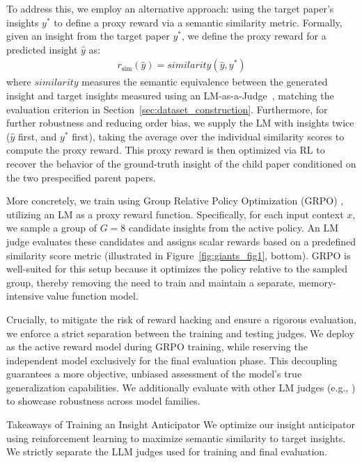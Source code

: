 To address this, we employ an alternative approach: using the target paper's insights $y^{*}$ to define a proxy reward via a semantic similarity metric. Formally, given an insight from the target paper $y^{*}$, we define the proxy reward for a predicted insight $\hat{y}$ as: 
\begin{align}
    r_{\text{sim}}(\hat{y}) = \textit{similarity}(\hat{y}, y^{*})
\end{align}
where $\textit{similarity}$ measures the semantic equivalence between the generated insight and target insights measured using an LM-as-a-Judge~\citep{gu2025surveyllmasajudge}, matching the evaluation criterion in Section~\ref{sec:dataset_construction}. Furthermore, for further robustness and reducing order bias, we supply the LM with insights twice ($\hat{y}$ first, and $y^{*}$ first), taking the average over the individual similarity scores to compute the proxy reward. 
This proxy reward is then optimized via RL to recover the behavior of the ground-truth insight of the child paper conditioned on the two prespecified parent papers.

More concretely, we train \ourmethod{} using Group Relative Policy Optimization (GRPO) \citep{shao2024deepseekmath}, utilizing an LM as a proxy reward function. Specifically, for each input context $x$, we sample a group of $G=8$ candidate insights from the active policy. An LM judge evaluates these candidates and assigns scalar rewards based on a predefined similarity score metric (illustrated in Figure~\ref{fig:giants_fig1}, bottom). GRPO is well-suited for this setup because it optimizes the policy relative to the sampled group, thereby removing the need to train and maintain a separate, memory-intensive value function model.

Crucially, to mitigate the risk of reward hacking and ensure a rigorous evaluation, we enforce a strict separation between the training and testing judges. We deploy \gemtwoflash{} as the active reward model during GRPO training, while reserving the independent \gemthreepro{} model exclusively for the final evaluation phase. This decoupling guarantees a more objective, unbiased assessment of the model's true generalization capabilities. We additionally evaluate with other LM judges (e.g., \qwenfourteenb{}) to showcase robustness across model families.

\begin{AIbox}{Takeaways of Training an Insight Anticipator}
We optimize our insight anticipator using reinforcement learning to maximize semantic similarity to target insights. We strictly separate the LLM judges used for training and final evaluation.
\end{AIbox}


